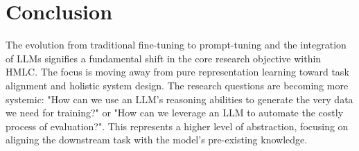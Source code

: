 \section{Conclusion}
The evolution from traditional fine-tuning to prompt-tuning and the integration of LLMs signifies a fundamental shift in the core research objective within HMLC. The focus is moving away from pure representation learning toward task alignment and holistic system design. The research questions are becoming more systemic: "How can we use an LLM's reasoning abilities to generate the very data we need for training?" or "How can we leverage an LLM to automate the costly process of evaluation?". 
This represents a higher level of abstraction, focusing on aligning the downstream task with the model's pre-existing knowledge.